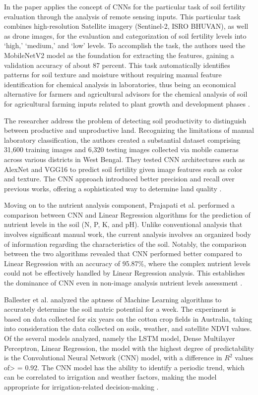 \documentclass[conference]{IEEEtran}
\begin{document}
In the paper applies the concept of CNNs for the particular task of soil fertility evaluation through the analysis of remote sensing inputs. This particular task combines high-resolution Satellite imagery (Sentinel-2, ISRO BHUVAN), as well as drone images, for the evaluation and categorization of soil fertility levels into ‘high,’ ‘medium,’ and ‘low’ levels. To accomplish the task, the authors used the MobileNetV2 model as the foundation for extracting the features, gaining a validation accuracy of about 87 percent. This task automatically identifies patterns for soil texture and moisture without requiring manual feature identification for chemical analysis in laboratories, thus being an economical alternative for farmers and agricultural advisors for the chemical analysis of soil for agricultural farming inputs related to plant growth and development phases \cite{b16}.
\vspace{5pt}


The researcher address the problem of detecting soil productivity to distinguish between productive and unproductive land. Recognizing the limitations of manual laboratory classification, the authors created a substantial dataset comprising 31,600 training images and 6,320 testing images collected via mobile cameras across various districts in West Bengal. They tested CNN architectures such as AlexNet and VGG16 to predict soil fertility given image features such as color and texture. The CNN approach introduced better precision and recall over previous works, offering a sophisticated way to determine land quality \cite{b17}.
\vspace{5pt}


Moving on to the nutrient analysis component, Prajapati et al. performed a comparison between CNN and Linear Regression algorithms for the prediction of nutrient levels in the soil (N, P, K, and pH). Unlike conventional analysis that involves significant manual work, the current analysis involves an organized body of information regarding the characteristics of the soil. Notably, the comparison between the two algorithms revealed that CNN performed better compared to Linear Regression with an accuracy of 95.87\%, where the complex nutrient levels could not be effectively handled by Linear Regression analysis. This establishes the dominance of CNN even in non-image analysis nutrient levels assessment \cite{b18}.
\vspace{5pt}


Ballester et al. analyzed the aptness of Machine Learning algorithms to accurately determine the soil matric potential for a week. The experiment is based on data collected for six years on the cotton crop fields in Australia, taking into consideration the data collected on soils, weather, and satellite NDVI values. Of the several models analyzed, namely the LSTM model, Dense Multilayer Perceptron, Linear Regression, the model with the highest degree of predictability is the Convolutional Neural Network (CNN) model, with a difference in $R^2$ values of> = 0.92. The CNN model has the ability to identify a periodic trend, which can be correlated to irrigation and weather factors, making the model appropriate for irrigation-related decision-making \cite{b19}.
\vspace{5pt}
\end{document}
